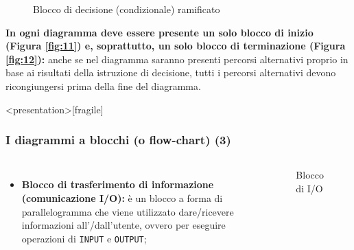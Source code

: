 \documentclass[
    notheorems,
    11pt,
    compress,
    aspectratio=169
]{beamer}
\begin{document}
\begin{frame}
\begin{figure}[htbp]
        
        \caption{Blocco di decisione (condizionale) ramificato}
        \label{fig:16}
    \end{figure}

    \textbf{In ogni diagramma deve essere presente un solo blocco di inizio (Figura \ref{fig:11}) e, soprattutto, un solo blocco di terminazione (Figura \ref{fig:12}):} anche se nel diagramma saranno presenti percorsi alternativi proprio in base ai risultati della istruzione di decisione, tutti i percorsi alternativi devono ricongiungersi prima della fine del diagramma.
\end{frame}

\begin{frame}<presentation>[fragile]
    \frametitle{I diagrammi a blocchi (o flow-chart) (3)}
    
    \begin{columns}
            \begin{itemize}
                \item \textbf{Blocco di trasferimento di informazione (comunicazione I/O):} è un blocco a forma di parallelogramma che viene utilizzato dare/ricevere informazioni all'/dall'utente, ovvero per eseguire operazioni di \verb|INPUT| e \verb|OUTPUT|;
            \end{itemize}

            \begin{figure}
                \centering
        
                
                \caption{Blocco di I/O}
                \label{fig:13}
            \end{figure}
    \end{columns}
\end{frame}
\end{document}
